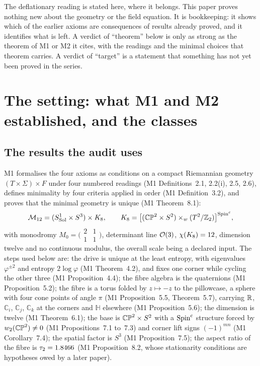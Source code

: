 \documentclass[11pt,a4paper]{article}
\theoremstyle{plain}
\theoremstyle{definition}
\theoremstyle{remark}
\newcommand{\Hquat}{\mathbb{H}}
\begin{document}
The deflationary reading is stated here, where it belongs. This paper proves nothing new about the geometry or the field equation. It is bookkeeping: it shows which of the earlier axioms are consequences of results already proved, and it identifies what is left. A verdict of ``theorem'' below is only as strong as the theorem of M1 or M2 it cites, with the readings and the minimal choices that theorem carries. A verdict of ``target'' is a statement that something has not yet been proved in the series.

\section{The setting: what M1 and M2 established, and the classes}\label{sec:setting}

\subsection{The results the audit uses}\label{sec:recall}

M1 formalises the four axioms as conditions on a compact Riemannian geometry $(T\times\Sigma)\times F$ under four numbered readings (M1 Definitions~2.1, 2.2(i), 2.5, 2.6), defines minimality by four criteria applied in order (M1 Definition~3.2), and proves that the minimal geometry is unique (M1 Theorem~8.1):
\begin{equation}\label{eq:M12}
\mathcal{M}_{12}=(S^{1}_{\mathrm{Sol}}\times S^{3})\times K_8,\qquad
K_8=\bigl[(\mathbb{CP}^2\times S^2)\times_{w}(T^2/\mathbb{Z}_2)\bigr]^{\text{Spin}^c},
\end{equation}
with monodromy $M_{0}=\bigl(\begin{smallmatrix}2&1\\1&1\end{smallmatrix}\bigr)$, determinant line $\mathcal{O}(3)$, $\chi(K_8)=12$, dimension twelve and no continuous modulus, the overall scale being a declared input. The steps used below are: the drive is unique at the least entropy, with eigenvalues $\varphi^{\pm2}$ and entropy $2\log\varphi$ (M1 Theorem~4.2), and fixes one corner while cycling the other three (M1 Proposition~4.4); the fibre algebra is the quaternions (M1 Proposition~5.2); the fibre is a torus folded by $z\mapsto-z$ to the pillowcase, a sphere with four cone points of angle $\pi$ (M1 Proposition~5.5, Theorem~5.7), carrying $\mathbb{R}$, $\mathbb{C}_{i}$, $\mathbb{C}_{j}$, $\mathbb{C}_{k}$ at the corners and $\Hquat$ elsewhere (M1 Proposition~5.6); the dimension is twelve (M1 Theorem~6.1); the base is $\mathbb{CP}^2\times S^2$ with a $\text{Spin}^c$ structure forced by $w_{2}(\mathbb{CP}^2)\neq0$ (M1 Propositions~7.1 to~7.3) and corner lift signs $(-1)^{mn}$ (M1 Corollary~7.4); the spatial factor is $S^{3}$ (M1 Proposition~7.5); the aspect ratio of the fibre is $\tau_2=1.8466$ (M1 Proposition~8.2, whose stationarity conditions are hypotheses owed by a later paper).
\end{document}
